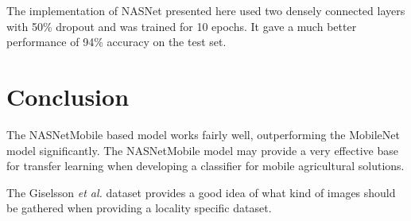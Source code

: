 \documentclass[]{article}
\begin{document}
The implementation of NASNet presented here used two densely connected layers with 50\% dropout and was trained for 10 epochs. It gave a much better performance of 94\% accuracy on the test set. 

\section{Conclusion}

The NASNetMobile based model works fairly well, outperforming the MobileNet model significantly.
The NASNetMobile model may provide a very effective base for transfer learning when developing a classifier for mobile agricultural solutions.

The Giselsson \emph{et al.}\cite{Giselsson2017} dataset provides a good idea of what kind of images should be gathered when providing a locality specific dataset. 


\clearpage


\end{document}
